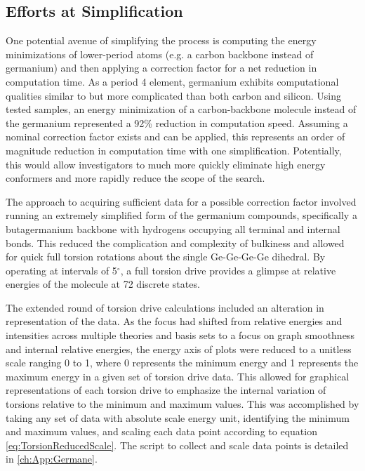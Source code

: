 \subsection{Efforts at Simplification}

One potential avenue of simplifying the process is computing the energy minimizations of lower-period atoms (e.g. a carbon backbone instead of germanium) and then applying a correction factor for a net reduction in computation time.
As a period 4 element, germanium exhibits computational qualities similar to but more complicated than both carbon and silicon.
Using tested samples, an energy minimization of a carbon-backbone molecule instead of the germanium represented a 92\% reduction in computation speed.
Assuming a nominal correction factor exists and can be applied, this represents an order of magnitude reduction in computation time with one simplification. 
Potentially, this would allow investigators to much more quickly eliminate high energy conformers and more rapidly reduce the scope of the search.

The approach to acquiring sufficient data for a possible correction factor involved running an extremely simplified form of the germanium compounds, specifically a butagermanium backbone with hydrogens occupying all terminal and internal bonds.
This reduced the complication and complexity of bulkiness and allowed for quick full torsion rotations about the single Ge-Ge-Ge-Ge dihedral.
By operating at intervals of 5$^{\circ}$, a full torsion drive provides a glimpse at relative energies of the molecule at 72 discrete states. 

The extended round of torsion drive calculations included an alteration in representation of the data.
As the focus had shifted from relative energies and intensities across multiple theories and basis sets to a focus on graph smoothness and internal relative energies, the energy axis of plots were reduced to a unitless scale ranging 0 to 1, where 0 represents the minimum energy and 1 represents the maximum energy in a given set of torsion drive data.
This allowed for graphical representations of each torsion drive to emphasize the internal variation of torsions relative to the minimum and maximum values.
This was accomplished by taking any set of data with absolute scale energy unit, identifying the minimum and maximum values, and scaling each data point according to equation \ref{eq:TorsionReducedScale}. 
The script to collect and scale data points is detailed in \ref{ch:App:Germane}.

